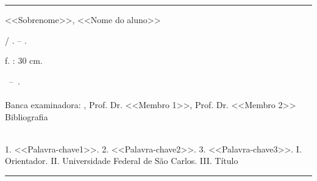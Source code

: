 %
%     

\begin{fichacatalografica}
	\vspace*{\fill}					%
	\hrule							%
	\begin{center}					%
	\begin{minipage}[c]{12.5cm}		%
	
	<<Sobrenome>>, <<Nome do aluno>> %
	
	\hspace{0.5cm} \imprimirtitulo  / \imprimirautor. --
	\the\year.
	
	\hspace{0.5cm} \pageref{LastPage} f. : 30 cm.\\
	
	\hspace{0.5cm}
	\parbox[t]{\textwidth}{\imprimirtipotrabalho~--~\imprimirinstituicao.\\ \imprimirorientadorRotulo~\imprimirorientador\\
	Banca examinadora: \imprimirorientador, Prof. Dr. <<Membro 1>>, Prof. Dr. <<Membro 2>>\\
	Bibliografia}\\

	\vspace{0.5cm}
	\hspace{0.5cm}
		1. <<Palavra-chave1>>. %
		2. <<Palavra-chave2>>. %
		3. <<Palavra-chave3>>. %
		I. Orientador.
		II. Universidade Federal de S\~{a}o Carlos.
		III. Título\\ 			
	
	
	\end{minipage}
	\end{center}
	\hrule
\end{fichacatalografica}
